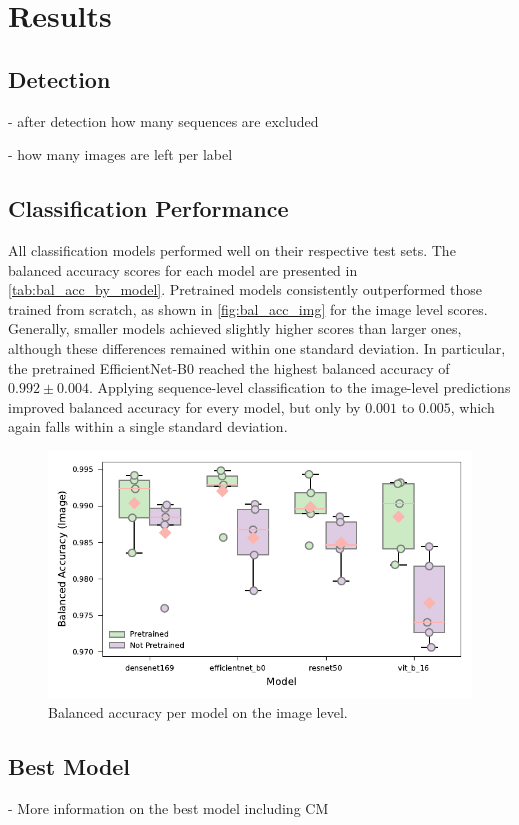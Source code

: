 

\section{Results}
\label{results}

    \subsection{Detection}

    - after detection how many sequences are excluded

    - how many images are left per label

    \subsection{Classification Performance}

    All classification models performed well on their respective test sets.
    The balanced accuracy scores for each model are presented in \autoref{tab:bal_acc_by_model}.
    Pretrained models consistently outperformed those trained from scratch, as shown in \autoref{fig:bal_acc_img} for the image level scores.
    Generally, smaller models achieved slightly higher scores than larger ones, although these differences remained within one standard deviation.
    In particular, the pretrained EfficientNet-B0 reached the highest balanced accuracy of \(0.992\pm0.004\).
    Applying sequence-level classification to the image-level predictions improved balanced accuracy for every model, but only by \(0.001\) to \(0.005\), which again falls within a single standard deviation.  


    

    \begin{figure}[ht]
    \centering
    \includegraphics{figures/bal_acc_img.pdf}
    \caption{Balanced accuracy per model on the image level.}
    \label{fig:bal_acc_img}
    \end{figure}


    \subsection{Best Model}

    - More information on the best model including CM
